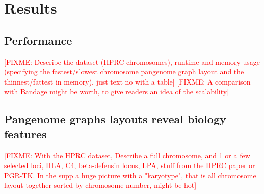 \documentclass{bioinfo}
\theoremstyle{definition}
\newcommand{\red}[1]{{\textcolor{Red}{#1}}}
\newcommand{\FIXME}[1]{\red{[FIXME: #1]}}
\begin{document}
    \iffalse
    Fig. 1: Describe how our approach works, especially a single update operation (Fig. \ref{fig:sketches}). Explanation of 1D graph updating in Figures \ref{fig:1d_before_update}-\ref{fig:1d_after_update}. Explanation of 2D graph updating in Figures \ref{fig:2d_before_update}-\ref{fig:2d_after_update}. Zipfian distribution.

    
    \fi

    \section{Results}
    \label{sec:results}

    \subsection{Performance}
	\FIXME{Describe the dataset (HPRC chromosomes), runtime and memory usage (specifying the fastest/slowest chromosome pangenome graph layout and the thinnest/fattest in memory), just text no with a table}
    \FIXME{A comparison with Bandage might be worth, to give readers an idea of the scalability}
	

    \subsection{Pangenome graphs layouts reveal biology features}
	\FIXME{With the HPRC dataset, Describe a full chromosome, and 1 or a few selected loci, HLA, C4, beta-defensin locus, LPA, stuff from the HPRC paper or PGR-TK.
	In the supp a huge picture with a "karyotype", that is all chromosome layout together sorted by chromosome number, might be hot}
\end{document}
